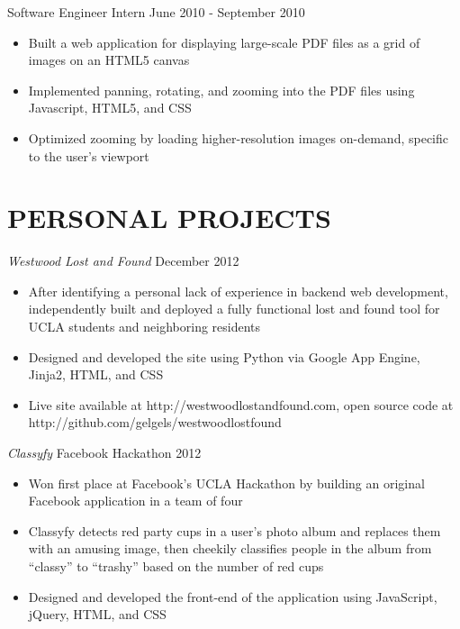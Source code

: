 \documentclass{res}
\begin{document}
\begin{resume}
 Software Engineer Intern \hfill    June 2010 - September 2010

   \begin{itemize} \itemsep -2pt
   \item Built a web application for displaying large-scale PDF files as a grid of images on an HTML5 canvas
   \item Implemented panning, rotating, and zooming into the PDF files using Javascript, HTML5, and CSS
	\item Optimized zooming by loading higher-resolution images on-demand, specific to the user's viewport
   \end{itemize} \vspace{-6pt}

\section{PERSONAL PROJECTS}
\vspace{6pt}

  {\sl Westwood Lost and Found } \hfill December 2012
  \begin{itemize} \itemsep -2pt
  \item{After identifying a personal lack of experience in backend web development, independently built and deployed a fully functional lost and found tool for UCLA students and neighboring residents }
  \item{Designed and developed the site using Python via Google App Engine, Jinja2, HTML, and CSS}
  \item{Live site available at http://westwoodlostandfound.com, open source code at http://github.com/gelgels/westwoodlostfound}
  \end{itemize}\vspace{-6pt}



 {\sl Classyfy} \hfill Facebook Hackathon 2012
   \begin{itemize} \itemsep -2pt
   \item{Won first place at Facebook's UCLA Hackathon by building an original Facebook application in a team of four}
   \item Classyfy detects red party cups in a user's photo album and replaces them with an amusing image, then cheekily classifies people in the album from ``classy'' to ``trashy'' based on the number of red cups
    \item Designed and developed the front-end of the application using JavaScript, jQuery,  HTML, and CSS
    \end{itemize} \vspace{-6pt}


\end{resume}
\end{document}
